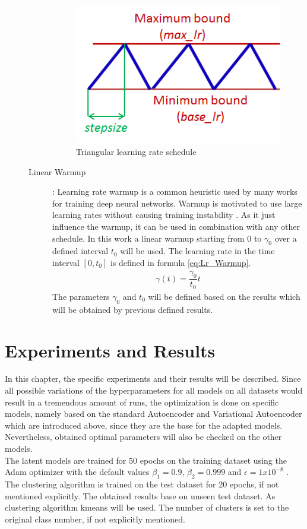 \documentclass[12pt,DIV14,BCOR12mm,a4paper,footexclude,headinclude,halfparskip-,twoside,openright,cleardoubleempty,idxtotoc,bibtotoc,listtotoc]{scrreprt} %
\numberwithin{equation}{chapter}
\begin{document}
\begin{description}
\begin{description}
		\begin{figure}[htb!]
			\centering
			\includegraphics[width=0.3\linewidth]{Graphiken/triangularWindow}
			\caption{Triangular learning rate schedule \cite{Smith15CyclicLearningRate}}
			\label{fig:Triangular Learning rate}
		\end{figure}
		\item[Linear Warmup]: Learning rate warmup is a common heuristic used by many works for training deep neural networks. Warmup is motivated to use large learning rates without causing training instability \cite{gotmare2018Warmup}. As it just influence the warmup, it can be used in combination with any other schedule. In this work a linear warmup starting from $0$ to $\gamma_0$ over a defined interval $t_0$ will be used. The learning rate in the time interval $[0, t_0]$ is defined in formula \ref{eq:Lr_Warmup}.
		\begin{align}
			\gamma(t) = \dfrac{\gamma_0}{t_0}t\label{eq:Lr_Warmup}
		\end{align}
		The parameters $\gamma_0$ and $t_0$ will be defined based on the results which will be obtained by previous defined results.
	\end{description}
\end{description}
\chapter{Experiments and Results}
In this chapter, the specific experiments and their results will be described. Since all possible variations of the hyperparameters for all models on all datasets would result in a tremendous amount of runs, the optimization is done on specific models, namely based on the standard Autoencoder and Variational Autoencoder which are introduced above, since they are the base for the adapted models. Nevertheless, obtained optimal parameters will also be checked on the other models.\\
The latent models are trained for 50 epochs on the training dataset using the Adam optimizer with the default values $\beta_1=0.9$, $\beta_2=0.999$ and $\epsilon = 1x10^{-8}$ \cite{Kingma14AdamOptimizer}. The clustering algorithm is trained on the test dataset for 20 epochs, if not mentioned explicitly. The obtained results base on unseen test dataset. As clustering algorithm kmeans will be used. The number of clusters is set to the original class number, if not explicitly mentioned.\\
\end{document}
